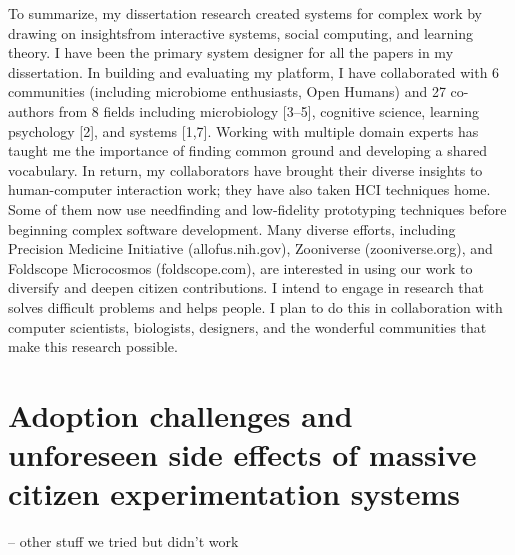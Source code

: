 To summarize, my dissertation research created systems for complex work by drawing on insightsfrom interactive systems, social computing, and learning theory. I have been the primary system designer for all the papers in my dissertation. In building and evaluating my platform, I have collaborated with 6 communities (including microbiome enthusiasts, Open Humans) and 27 co-authors from 8 fields including microbiology [3–5], cognitive science, learning psychology [2], and systems [1,7]. Working with multiple domain experts has taught me the importance of finding common ground and developing a shared vocabulary. In return, my collaborators have brought their diverse insights to human-computer interaction work; they have also taken HCI techniques home. Some of them now use needfinding and low-fidelity prototyping techniques before beginning complex software development. Many diverse efforts, including Precision Medicine Initiative (allofus.nih.gov), Zooniverse (zooniverse.org), and Foldscope Microcosmos (foldscope.com), are interested in using our work to diversify and deepen citizen contributions. I intend to engage in research that solves difficult problems and helps people. I plan to do this in collaboration with computer scientists, biologists, designers, and the wonderful communities that make this research possible.



\section{Adoption challenges and unforeseen side effects of massive citizen experimentation systems}
-- other stuff we tried but didn’t work


